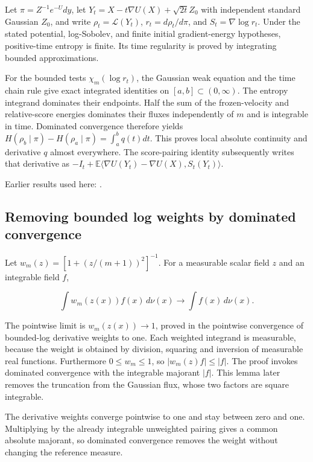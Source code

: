\documentclass[11pt,a4paper]{report}
\begin{document}
Let \(\pi=Z^{-1}e^{-U}dy\), let \(Y_t=X-t\nabla U(X)+\sqrt{2t}Z_0\) with independent standard Gaussian \(Z_0\), and write \(\rho_t=\mathcal L(Y_t)\), \(r_t=d\rho_t/d\pi\), and \(S_t=\nabla\log r_t\). Under the stated potential, log-Sobolev, and finite initial gradient-energy hypotheses, positive-time entropy is finite. Its time regularity is proved by integrating bounded approximations.



For the bounded tests \(\chi_m(\log r_t)\), the Gaussian weak equation and the time chain rule give exact integrated identities on \([a,b]\subset(0,\infty)\). The entropy integrand dominates their endpoints. Half the sum of the frozen-velocity and relative-score energies dominates their fluxes independently of \(m\) and is integrable in time. Dominated convergence therefore yields \(H(\rho_b\mid\pi)-H(\rho_a\mid\pi)=\int_a^bq(t)dt\). This proves local absolute continuity and derivative \(q\) almost everywhere. The score-pairing identity subsequently writes that derivative as \(-I_t+\mathbb E\langle\nabla U(Y_t)-\nabla U(X),S_t(Y_t)\rangle\).



Earlier results used here: \cite[Section~3.46]{LangevinLean2026ULASC}.
\subsection{\texorpdfstring{Removing bounded log weights by dominated convergence}{Removing bounded log weights by dominated convergence}}
\label{report-step-UnadjustedLangevin-LSI-GaussianEntropyIdentity-lean-1}


Let \(w_m(z)=[1+(z/(m+1))^2]^{-1}\). For a measurable scalar field \(z\) and an integrable field \(f\),

\[\int w_m(z(x))f(x)\,d\nu(x)\longrightarrow\int f(x)\,d\nu(x).\]

The pointwise limit is \(w_m(z(x))\to1\), proved in the pointwise convergence of bounded-log derivative weights to one. Each weighted integrand is measurable, because the weight is obtained by division, squaring and inversion of measurable real functions. Furthermore \(0\le w_m\le1\), so \(|w_m(z)f|\le|f|\). The proof invokes dominated convergence with the integrable majorant \(|f|\). This lemma later removes the truncation from the Gaussian flux, whose two factors are square integrable.



The derivative weights converge pointwise to one and stay between zero and one. Multiplying by the already integrable unweighted pairing gives a common absolute majorant, so dominated convergence removes the weight without changing the reference measure.
\end{document}
